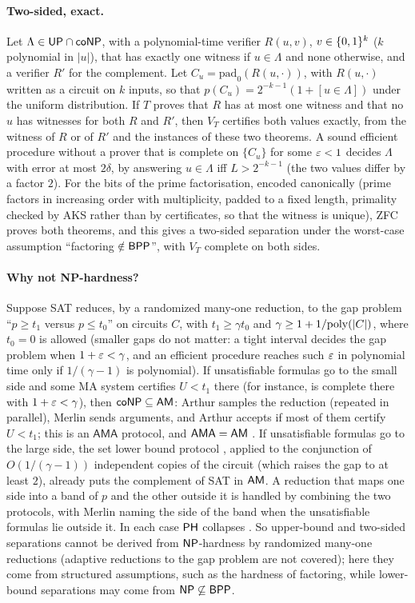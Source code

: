 \paragraph{Two-sided, exact.} Let $\Lambda\in\mathsf{UP}\cap\mathsf{coNP}$, with a
polynomial-time verifier $R(u,v)$, $v\in\{0,1\}^k$ ($k$ polynomial in $|u|$), that has
exactly one witness if $u\in\Lambda$ and none otherwise, and a verifier $R'$ for the
complement. Let $C_u=\mathrm{pad}_0(R(u,\cdot))$, with $R(u,\cdot)$ written as a
circuit on $k$ inputs, so that $p(C_u)=2^{-k-1}(1+[u\in\Lambda])$ under the uniform
distribution. If $T$ proves that $R$ has at most one witness and that no $u$ has
witnesses for both $R$ and $R'$, then $V_T$ certifies both values exactly, from the
witness of $R$ or of $R'$ and the instances of these two theorems. A sound efficient
procedure without a prover that is complete on $\{C_u\}$ for some $\varepsilon<1$ decides
$\Lambda$ with error at most $2\delta$, by answering $u\in\Lambda$ iff $L>2^{-k-1}$
(the two values differ by a factor $2$). For the bits of the prime factorisation,
encoded canonically (prime factors in increasing order with multiplicity, padded to a
fixed length, primality checked by AKS \cite{aks2004} rather than by certificates, so
that the witness is unique), ZFC proves both theorems, and this gives a two-sided
separation under the worst-case assumption ``factoring $\notin\mathsf{BPP}$'', with $V_T$
complete on both sides.

\paragraph{Why not NP-hardness?} Suppose SAT reduces, by a randomized many-one
reduction, to the gap problem ``$p\ge t_1$ versus $p\le t_0$'' on circuits $C$, with
$t_1\ge\gamma t_0$ and $\gamma\ge1+1/\mathrm{poly}(|C|)$, where $t_0=0$ is allowed (smaller
gaps do not matter: a tight interval decides the gap problem when $1+\varepsilon<\gamma$, and
an efficient procedure reaches such $\varepsilon$ in polynomial time only if $1/(\gamma-1)$ is
polynomial). If unsatisfiable formulas go to the small side and some MA system
certifies $U<t_1$ there (for instance, is complete there with $1+\varepsilon<\gamma$), then
$\mathsf{coNP}\subseteq\mathsf{AM}$: Arthur samples the reduction (repeated in parallel), Merlin sends
arguments, and Arthur accepts if most of them certify $U<t_1$; this is an
$\mathsf{AMA}$ protocol, and $\mathsf{AMA}=\mathsf{AM}$ \cite{babai1985}. If unsatisfiable
formulas go to the large side, the set lower bound protocol \cite{gs1986}, applied to
the conjunction of $O(1/(\gamma-1))$ independent copies of the circuit (which raises
the gap to at least $2$), already puts the complement of SAT in $\mathsf{AM}$. A reduction
that maps one side into a band of $p$ and the other outside it is handled by combining
the two protocols, with Merlin naming the side of the band when the unsatisfiable
formulas lie outside it. In each case $\mathsf{PH}$ collapses \cite{bhz1987}. So
upper-bound and two-sided separations cannot be derived from $\mathsf{NP}$-hardness by
randomized many-one reductions (adaptive reductions to the gap problem are not
covered); here they come from structured assumptions, such as the hardness of
factoring, while lower-bound separations may come from $\mathsf{NP}\not\subseteq\mathsf{BPP}$.

